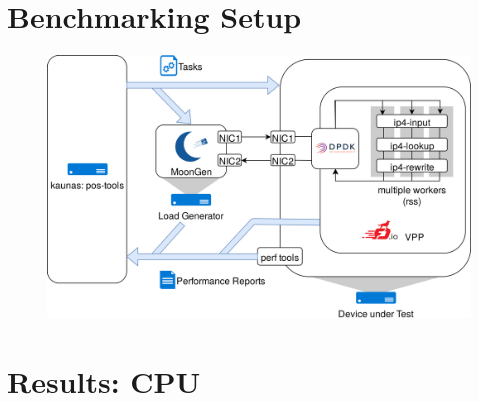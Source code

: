 \section{Benchmarking Setup}

\begin{frame}
    \begin{figure}
    \noindent\hspace{5mm}\includegraphics[width=0.9\linewidth]{pics/topology.png}
    \label{setup}
    \end{figure}
\end{frame}


\section{Results: CPU}



